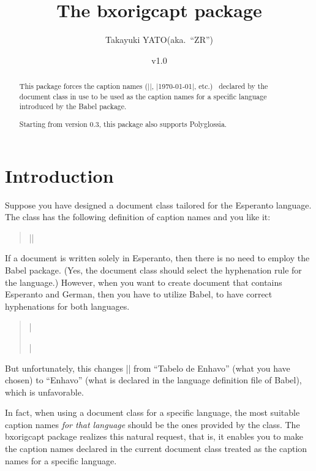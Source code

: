 \documentclass[a4paper]{article}
\newcommand{\PkgVersion}{1.0}
\newcommand{\PkgDate}{2022/04/10}
\newcommand{\Pkg}[1]{\textsf{#1}}
\begin{document}
\title{The \Pkg{bxorigcapt} package}
\author{Takayuki YATO\quad (aka.~``ZR'')}
\date{v\PkgVersion\quad[\PkgDate]}
\maketitle
\begin{abstract}
This package forces the caption names (|\chaptername|, |\today|, etc.)\ %
declared by the document class in use to be used as the caption names
for a specific language introduced by the Babel package.

Starting from version 0.3, this package also supports Polyglossia.
\end{abstract}

\section{Introduction}
\label{sec:Introduction}

Suppose you have designed a document class
tailored for the Esperanto language.
The class has the following definition of caption names
and you like it:
\begin{quote}
|\newcommand\contentsname{Tabelo de Enhavo}|
\end{quote}

If a document is written solely in Esperanto,
then there is no need to employ the Babel package.
(Yes, the document class should select the hyphenation rule
for the language.)
However, when you want to create document
that contains Esperanto and German,
then you have to utilize Babel,
to have correct hyphenations for both languages.
\begin{quote}
|\usepackage[ngerman,esperanto]{babel}|
\end{quote}

But unfortunately, this changes |\contentsname|
from ``Tabelo de Enhavo'' (what you have chosen)
to ``Enhavo''
(what is declared in the language definition file of Babel),
which is unfavorable.

In fact, when using a document class for a specific language,
the most suitable caption names \emph{for that language}
should be the ones provided by the class.
The \Pkg{bxorigcapt} package realizes this natural request,
that is, it enables you
to make the caption names declared in the current document class
treated as the caption names for a specific language.


\end{document}
